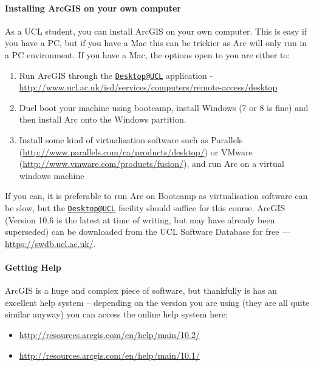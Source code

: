 \documentclass[]{book}
\providecommand{\tightlist}{%
  \setlength{\itemsep}{0pt}\setlength{\parskip}{0pt}}
\let\oldparagraph\paragraph
\renewcommand{\paragraph}[1]{\oldparagraph{#1}\mbox{}}
\begin{document}
\hypertarget{installing-arcgis-on-your-own-computer}{%
\paragraph{Installing ArcGIS on your own computer}\label{installing-arcgis-on-your-own-computer}}

As a UCL student, you can install ArcGIS on your own computer. This is easy if you have a PC, but if you have a Mac this can be trickier as Arc will only run in a PC environment. If you have a Mac, the options open to you are either to:

\begin{enumerate}
\def\labelenumi{\alph{enumi})}
\tightlist
\item
  Run ArcGIS through the \href{mailto:Desktop@UCL}{\nolinkurl{Desktop@UCL}} application - \url{http://www.ucl.ac.uk/isd/services/computers/remote-access/desktop}
\item
  Duel boot your machine using bootcamp, install Windows (7 or 8 is fine) and then install Arc onto the Windows partition.
\item
  Install some kind of virtualisation software such as Parallels (\url{http://www.parallels.com/ca/products/desktop/}) or VMware (\url{http://www.vmware.com/products/fusion/}), and run Arc on a virtual windows machine
\end{enumerate}

If you can, it is preferable to run Arc on Bootcamp as virtualisation software can be slow, but the \href{mailto:Desktop@UCL}{\nolinkurl{Desktop@UCL}} facility should suffice for this course.
ArcGIS (Version 10.6 is the latest at time of writing, but may have already been superseded) can be downloaded from the UCL Software Database for free --- \url{https://swdb.ucl.ac.uk/}.

\hypertarget{getting-help}{%
\paragraph{Getting Help}\label{getting-help}}

ArcGIS is a huge and complex piece of software, but thankfully is has an excellent help system -- depending on the version you are using (they are all quite similar anyway) you can access the online help system here:

\begin{itemize}
\item
  \url{http://resources.arcgis.com/en/help/main/10.2/}
\item
  \url{http://resources.arcgis.com/en/help/main/10.1/}
\end{itemize}
\end{document}

